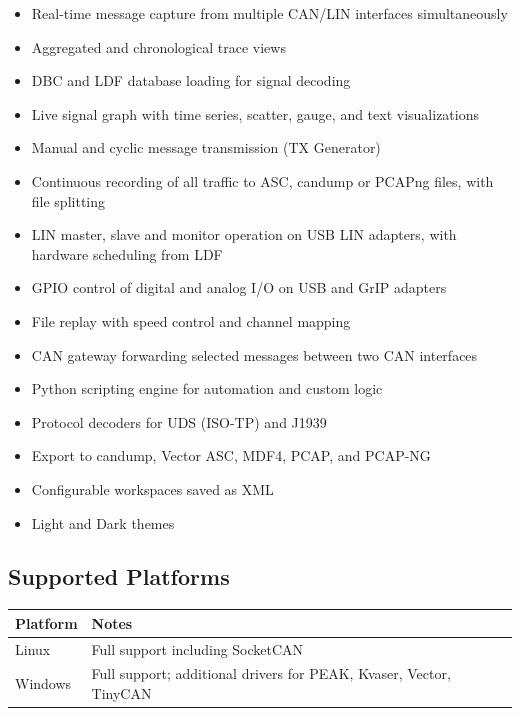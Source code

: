 \documentclass[a4paper,11pt]{article}
\begin{document}
\begin{itemize}[leftmargin=1.5em]
  \item Real-time message capture from multiple CAN/LIN interfaces simultaneously
  \item Aggregated and chronological trace views
  \item DBC and LDF database loading for signal decoding
  \item Live signal graph with time series, scatter, gauge, and text visualizations
  \item Manual and cyclic message transmission (TX Generator)
  \item Continuous recording of all traffic to ASC, candump or PCAPng files, with file splitting
  \item LIN master, slave and monitor operation on USB LIN adapters, with hardware scheduling from LDF
  \item GPIO control of digital and analog I/O on USB and GrIP adapters
  \item File replay with speed control and channel mapping
  \item CAN gateway forwarding selected messages between two CAN interfaces
  \item Python scripting engine for automation and custom logic
  \item Protocol decoders for UDS (ISO-TP) and J1939
  \item Export to candump, Vector ASC, MDF4, PCAP, and PCAP-NG
  \item Configurable workspaces saved as XML
  \item Light and Dark themes
\end{itemize}

\subsection{Supported Platforms}

\begin{table}[h]
  \centering
  \begin{tabularx}{0.8\textwidth}{lX}
    \toprule
    \textbf{Platform} & \textbf{Notes} \\
    \midrule
    Linux   & Full support including SocketCAN \\
    Windows & Full support; additional drivers for PEAK, Kvaser, Vector, TinyCAN \\
    \bottomrule
  \end{tabularx}
\end{table}
\end{document}
